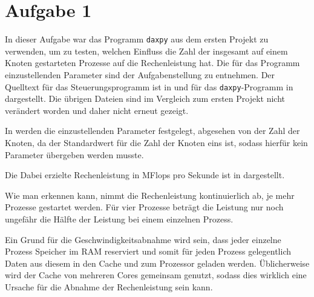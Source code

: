 \section*{Aufgabe 1}
In dieser Aufgabe war das Programm \texttt{daxpy} aus dem ersten Projekt zu verwenden,
um zu testen, welchen Einfluss die Zahl der insgesamt auf einem Knoten gestarteten
Prozesse auf die Rechenleistung hat. Die für das Programm einzustellenden Parameter
sind der Aufgabenstellung zu entnehmen. Der Quelltext für das Steuerungsprogramm
ist in  und für das \texttt{daxpy}-Programm in  dargestellt.
Die übrigen Dateien sind im Vergleich zum ersten Projekt nicht verändert worden
und daher nicht erneut gezeigt.




In  werden die einzustellenden Parameter festgelegt, abgesehen von
der Zahl der Knoten, da der Standardwert für die Zahl der Knoten eins ist, sodass
hierfür kein Parameter übergeben werden musste.

Die Dabei erzielte Rechenleistung in MFlops pro Sekunde ist in  dargestellt.



Wie man erkennen kann, nimmt die Rechenleistung kontinuierlich ab, je mehr Prozesse
gestartet werden. Für vier Prozesse beträgt die Leistung nur noch ungefähr die
Hälfte der Leistung bei einem einzelnen Prozess.

Ein Grund für die Geschwindigkeitsabnahme wird sein, dass jeder einzelne Prozess
Speicher im RAM reserviert und somit für jeden Prozess gelegentlich Daten aus diesem
in den Cache und zum Prozessor geladen werden. Üblicherweise wird der Cache von
mehreren Cores gemeinsam genutzt, sodass dies wirklich eine Ursache für die Abnahme
der Rechenleistung sein kann.
